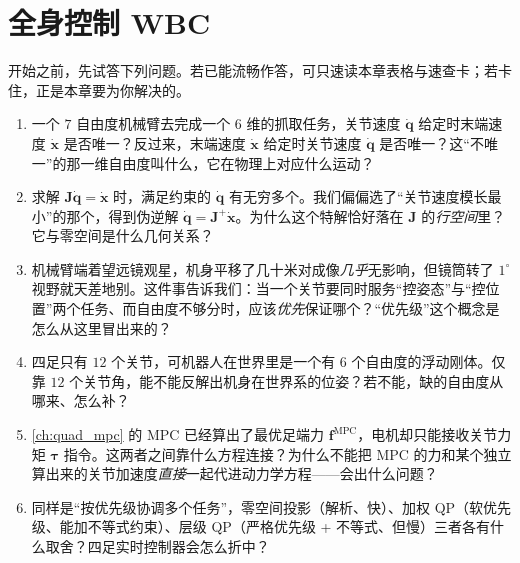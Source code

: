 \chapter{全身控制 WBC}
\label{ch:quad_wbc}



\begin{practice}[前置自测]
开始之前，先试答下列问题。若已能流畅作答，可只速读本章表格与速查卡；若卡住，正是本章要为你解决的。
\begin{enumerate}
  \item 一个 $7$ 自由度机械臂去完成一个 $6$ 维的抓取任务，关节速度 $\dot{\boldsymbol{q}}$ 给定时末端速度 $\dot{\boldsymbol{x}}$ 是否唯一？反过来，末端速度 $\dot{\boldsymbol{x}}$ 给定时关节速度 $\dot{\boldsymbol{q}}$ 是否唯一？这“不唯一”的那一维自由度叫什么，它在物理上对应什么运动？
  \item 求解 $\boldsymbol{J}\dot{\boldsymbol{q}}=\dot{\boldsymbol{x}}$ 时，满足约束的 $\dot{\boldsymbol{q}}$ 有无穷多个。我们偏偏选了“关节速度模长最小”的那个，得到伪逆解 $\dot{\boldsymbol{q}}=\boldsymbol{J}^+\dot{\boldsymbol{x}}$。为什么这个特解恰好落在 $\boldsymbol{J}$ 的\emph{行空间}里？它与零空间是什么几何关系？
  \item 机械臂端着望远镜观星，机身平移了几十米对成像\emph{几乎}无影响，但镜筒转了 $1^\circ$ 视野就天差地别。这件事告诉我们：当一个关节要同时服务“控姿态”与“控位置”两个任务、而自由度不够分时，应该\emph{优先}保证哪个？“优先级”这个概念是怎么从这里冒出来的？
  \item 四足只有 $12$ 个关节，可机器人在世界里是一个有 $6$ 个自由度的浮动刚体。仅靠 $12$ 个关节角，能不能反解出机身在世界系的位姿？若不能，缺的自由度从哪来、怎么补？
  \item \cref{ch:quad_mpc} 的 MPC 已经算出了最优足端力 $\boldsymbol{f}^{\mathrm{MPC}}$，电机却只能接收关节力矩 $\boldsymbol{\tau}$ 指令。这两者之间靠什么方程连接？为什么不能把 MPC 的力和某个独立算出来的关节加速度\emph{直接}一起代进动力学方程——会出什么问题？
  \item 同样是“按优先级协调多个任务”，零空间投影（解析、快）、加权 QP（软优先级、能加不等式约束）、层级 QP（严格优先级 + 不等式、但慢）三者各有什么取舍？四足实时控制器会怎么折中？
\end{enumerate}
\end{practice}

